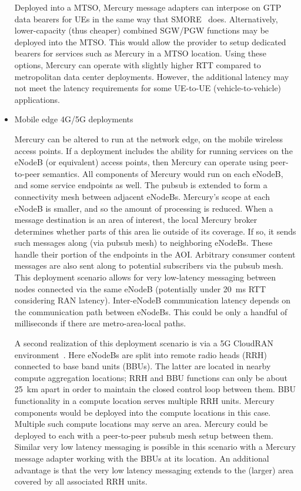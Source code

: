 \begin{itemize}
Deployed into a MTSO, Mercury message adapters can interpose on GTP
data bearers for UEs in the same way that SMORE~\cite{cho2014smore}
does. Alternatively, lower-capacity (thus cheaper) combined SGW/PGW
functions may be deployed into the MTSO. This would allow the provider
to setup dedicated bearers for services such as Mercury in a MTSO
location.  Using these options, Mercury can operate with slightly
higher RTT compared to metropolitan data center deployments.  However,
the additional latency may not meet the latency requirements for some
UE-to-UE (vehicle-to-vehicle) applications.

\item Mobile edge 4G/5G deployments

Mercury can be altered to run at the network edge, on the mobile
wireless access points.  If a deployment includes the ability for
running services on the eNodeB (or equivalent) access points, then
Mercury can operate using peer-to-peer semantics.  All components of
Mercury would run on each eNodeB, and some service endpoints as
well. The pubsub is extended to form a connectivity mesh between
adjacent eNodeBs. Mercury's scope at each eNodeB is smaller, and so
the amount of processing is reduced. When a message destination is an
area of interest, the local Mercury broker determines whether parts of
this area lie outside of its coverage.  If so, it sends such messages
along (via pubsub mesh) to neighboring eNodeBs. These handle their
portion of the endpoints in the AOI.  Arbitrary consumer content
messages are also sent along to potential subscribers via the pubsub
mesh.  This deployment scenario allows for very low-latency messaging
between nodes connected via the same eNodeB (potentially under 20~ms
RTT considering RAN latency). Inter-eNodeB communication latency
depends on the communication path between eNodeBs.  This could be only
a handful of milliseconds if there are metro-area-local paths.

A second realization of this deployment scenario is via a 5G CloudRAN
environment~\cite{checko2015cloud}. Here eNodeBs are split into remote radio
heads (RRH) connected to base band units (BBUs).  The latter are
located in nearby compute aggregation locations; RRH and BBU functions
can only be about 25~km apart in order to maintain the closed control
loop between them. BBU functionality in a compute location serves
multiple RRH units. Mercury components would be deployed into the
compute locations in this case.  Multiple such compute locations may
serve an area. Mercury could be deployed to each with a peer-to-peer
pubsub mesh setup between them.  Similar very low latency messaging is
possible in this scenario with a Mercury message adapter working with
the BBUs at its location.  An additional advantage is that the very
low latency messaging extends to the (larger) area covered by all
associated RRH units.

\end{itemize}
